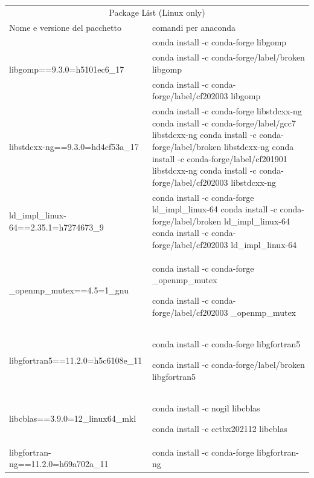 \medskip
\begin{table}
\begin{tabular}{ |p{8cm}||p{8cm}|}

\multicolumn{2}{|c|}{Package List (Linux only)} \\


Nome e versione del pacchetto& comandi per anaconda\\ \hline


\multirow{3}{*}{libgomp==9.3.0=h5101ec6\_17}   &	conda install -c conda-forge libgomp \\
& conda install -c conda-forge/label/broken libgomp \\
& conda install -c conda-forge/label/cf202003 libgomp\\ \hline



  libstdcxx-ng==9.3.0=hd4cf53a\_17  &	conda install -c conda-forge libstdcxx-ng conda install -c conda-forge/label/gcc7 libstdcxx-ng  conda install -c conda-forge/label/broken libstdcxx-ng  conda install -c conda-forge/label/cf201901 libstdcxx-ng 	conda install -c conda-forge/label/cf202003 libstdcxx-ng\\ \hline



  ld\_impl\_linux-64==2.35.1=h7274673\_9  &	conda install -c conda-forge ld\_impl\_linux-64 conda install -c conda-forge/label/broken ld\_impl\_linux-64 conda install -c conda-forge/label/cf202003 ld\_impl\_linux-64\\ \hline



  \_openmp\_mutex==4.5=1\_gnu  &	conda install -c conda-forge \_openmp\_mutex

	conda install -c conda-forge/label/cf202003 \_openmp\_mutex\\ \hline


		
  libgfortran5==11.2.0=h5c6108e\_11 &
	conda install -c conda-forge libgfortran5

	conda install -c conda-forge/label/broken libgfortran5\\ \hline



  libcblas==3.9.0=12\_linux64\_mkl &
	conda install -c nogil libcblas

	conda install -c cctbx202112 libcblas\\ \hline



  libgfortran-ng==11.2.0=h69a702a\_11  &
	conda install -c conda-forge libgfortran-ng


\end{tabular}
\end{table}
